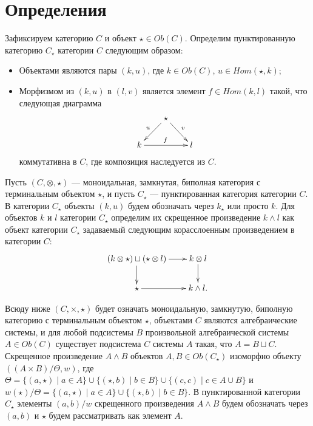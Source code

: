 \documentclass[a4paper,12pt]{article}
\begin{document}
\section*{Определения}

Зафиксируем категорию $C$ и объект $\star \in Ob(C)$. Определим пунктированную категорию $C_\star$ категории $C$ следующим образом:
\begin{itemize}
    \item Объектами являются пары $(k,u)$, где $k \in Ob(C)$, $u \in Hom(\star,k)$;
    \item Морфизмом из $(k,u)$ в $(l,v)$ является элемент $f \in Hom(k,l)$ такой, что следующая диаграмма
    $$\xymatrix@R=2em@C=2em{
        &\star \ar[ld]_u \ar[rd]^v&\\
        k \ar[rr]^f && l
    }$$
    коммутативна в $C$, где композиция наследуется из $C$.
\end{itemize}

Пусть $(C,\otimes,\star)$ --- моноидальная, замкнутая, биполная категория с терминальным объектом $\star$, и пусть $C_\star$ --- пунктированная категория категории $C$. В категории $C_\star$ объекты $(k,u)$ будем обозначать через $k_\star$ или просто $k$. Для объектов $k$ и $l$ категории $C_\star$ определим их скрещенное произведение $k \wedge l$ как объект категории $C_\star$ задаваемый следующим корасслоенным произведением в категории $C$:
$$\xymatrix@R=2em@C=2em{
    (k \otimes \star) \sqcup (\star \otimes l) \ar[r] \ar[d] & k \otimes l \ar[d]\\
    \star \ar[r] & k \wedge l.
}$$

Всюду ниже $(C, \times, \star)$ будет означать моноидальную, замкнутую, биполную категорию с терминальным объектом $\star$, объектами $C$ являются алгебраические системы, и для любой подсистемы $B$ произвольной алгебраической системы $A \in Ob(C)$ существует подсистема $C$ системы $A$ такая, что $A = B \sqcup C$. Скрещенное произведение $A \wedge B$ объектов $A, B \in Ob(C_\star)$ изоморфно объекту $((A \times B)/\Theta,w)$, где $\Theta = \{(a,\star) \mid a \in A\} \cup \{(\star,b) \mid b \in B\} \cup \{(c,c) \mid c \in A \cup B\}$ и $w(\star)/\Theta = \{(a,\star) \mid a \in A\} \cup \{(\star, b) \mid b \in B\}$. В пунктированной категории $C_\star$ элементы $(a,b)/w$ скрещенного произведения $A \wedge B$ будем обозначать через $(a,b)$ и $\star$ будем рассматривать как элемент $A$.
\end{document}
